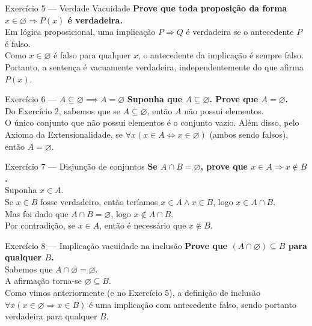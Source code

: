 \documentclass[12pt]{article}
\begin{document}
\begin{block}{Exercício 5 — Verdade Vacuidade}
\textbf{Prove que toda proposição da forma $x \in \varnothing \Rightarrow P(x)$ é verdadeira.} \\
Em lógica proposicional, uma implicação $P \Rightarrow Q$ é verdadeira se o antecedente $P$ é falso. \\
Como $x \in \varnothing$ é falso para qualquer $x$, o antecedente da implicação é sempre falso. \\
Portanto, a sentença é vacuamente verdadeira, independentemente do que afirma $P(x)$.
\end{block}

\begin{block}{Exercício 6 — $A \subseteq \varnothing \implies A = \varnothing$}
\textbf{Suponha que $A \subseteq \varnothing$. Prove que $A=\varnothing$.} \\
Do Exercício 2, sabemos que se $A \subseteq \varnothing$, então $A$ não possui elementos. \\
O único conjunto que não possui elementos é o conjunto vazio. Além disso, pelo Axioma da Extensionalidade, se $\forall x (x \in A \iff x \in \varnothing)$ (ambos sendo falsos), então $A = \varnothing$.
\end{block}

\begin{block}{Exercício 7 — Disjunção de conjuntos}
\textbf{Se $A \cap B=\varnothing$, prove que $x \in A \Rightarrow x \notin B$.} \\
Suponha $x \in A$. \\
Se $x \in B$ fosse verdadeiro, então teríamos $x \in A \land x \in B$, logo $x \in A \cap B$. \\
Mas foi dado que $A \cap B = \varnothing$, logo $x \notin A \cap B$. \\
Por contradição, se $x \in A$, então é necessário que $x \notin B$.
\end{block}

\begin{block}{Exercício 8 — Implicação vacuidade na inclusão}
\textbf{Prove que $(A \cap \varnothing) \subseteq B$ para qualquer $B$.} \\
Sabemos que $A \cap \varnothing = \varnothing$. \\
A afirmação torna-se $\varnothing \subseteq B$. \\
Como vimos anteriormente (e no Exercício 5), a definição de inclusão $\forall x (x \in \varnothing \Rightarrow x \in B)$ é uma implicação com antecedente falso, sendo portanto verdadeira para qualquer $B$.
\end{block}
\end{document}
